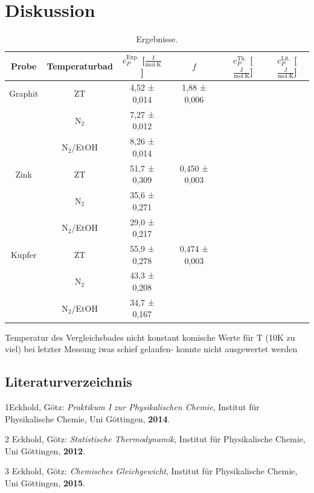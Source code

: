 \documentclass[12pt,a4paper,titlepage,headinclude,bibtotoc]{scrartcl}
\begin{document}
\section{Diskussion}
\begin{table}[h!]
\centering
\caption{Ergebnisse.}
\begin{tabular}{c|c|c|c|c|c}
Probe&Temperaturbad&$\text{c}_P^{\text{Exp.}}$ [$\frac{\text{J}}{\text{mol}\cdot\text{K}}$] & $f$ &$\text{c}_P^{\text{Th.}}$ [$\frac{\text{J}}{\text{mol}\cdot\text{K}}$] &$\text{c}_P^{\text{Lit.}}$ [$\frac{\text{J}}{\text{mol}\cdot\text{K}}$] \\
\hline
Graphit& ZT&4,52 ± 0,014 &1,88 ± 0,006&\\
\hline
&$\text{N}_2$&7,27 ± 0,012&&\\
\hline
&$\text{N}_2$/EtOH&8,26 ± 0,014 &&\\
\hline
Zink &ZT& 51,7 ± 0,309&  0,450 ± 0,003&\\
\hline
&$\text{N}_2$& 35,6 ± 0,271&&\\
\hline
&$\text{N}_2$/EtOH& 29,0 ± 0,217&&\\
\hline
Kupfer &ZT&55,9 ± 0,278& 0,474 ± 0,003&\\
\hline
&$\text{N}_2$&43,3 ± 0,208&&\\
\hline
&$\text{N}_2$/EtOH& 34,7 ± 0,167&&\\
\end{tabular}
\end{table}
\FloatBarrier
Temperatur des Vergleichsbades nicht konstant
komische Werte für T (10K zu viel)
bei letzter Messung iwas schief gelaufen- konnte nicht ausgewertet werden


\newpage


\subsection{Literaturverzeichnis}
1\quad Eckhold, Götz: \emph{Praktikum I zur Physikalischen Chemie}, Institut für Physikalische Chemie, Uni Göttingen, \textbf{2014}.
\vspace{0,5 cm}

2 \quad Eckhold, Götz: \emph{Statistische Thermodynamik}, Institut für Physikalische Chemie, Uni Göttingen, \textbf{2012}.

\vspace{0,5cm}

3 \quad Eckhold, Götz: \emph{Chemisches Gleichgewicht}, Institut für Physikalische Chemie, Uni Göttingen, \textbf{2015}.\\
\end{document}
